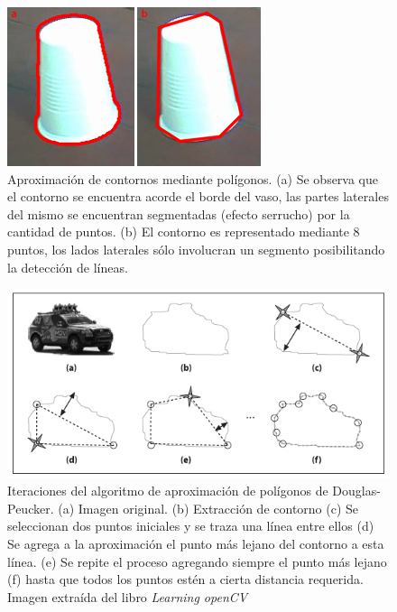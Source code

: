 \begin{figure}[htpb]
\begin{center}
  \includegraphics[scale=0.8]{vision/figures/polyaprox.png}
\end{center}
  \caption[Aproximaci\'on de contornos mediante pol\'igonos]{\small Aproximaci\'on de contornos mediante pol\'igonos. (a) Se observa que el contorno se encuentra acorde el borde del vaso, las
  partes laterales del mismo se encuentran segmentadas (efecto serrucho) por la cantidad de puntos. (b) El contorno es representado mediante
  8 puntos, los lados laterales s\'olo involucran un segmento posibilitando la detecci\'on de l\'ineas.}
  \label{fig:polyVasos}
\end{figure}

\begin{figure}[htpb]
\begin{center}
  \includegraphics[scale=0.6]{vision/figures/douglas-pecker.png}
\end{center}
  \caption[Algoritmo de aproximaci\'on de pol\'igonos]{\small Iteraciones del algoritmo de aproximaci\'on de pol\'igonos de Douglas-Peucker. (a) Imagen original. (b) Extracci\'on de contorno
  (c) Se seleccionan dos puntos iniciales y se traza una l\'inea entre ellos (d) Se agrega a la aproximaci\'on el punto m\'as lejano del contorno a esta l\'inea.
  (e) Se repite el proceso agregando siempre el punto m\'as lejano (f) hasta que todos los puntos est\'en a cierta distancia requerida. Imagen extra\'ida del libro \textit{Learning openCV}\cite{lopencv}}
  \label{fig:polyaprox}
\end{figure}

